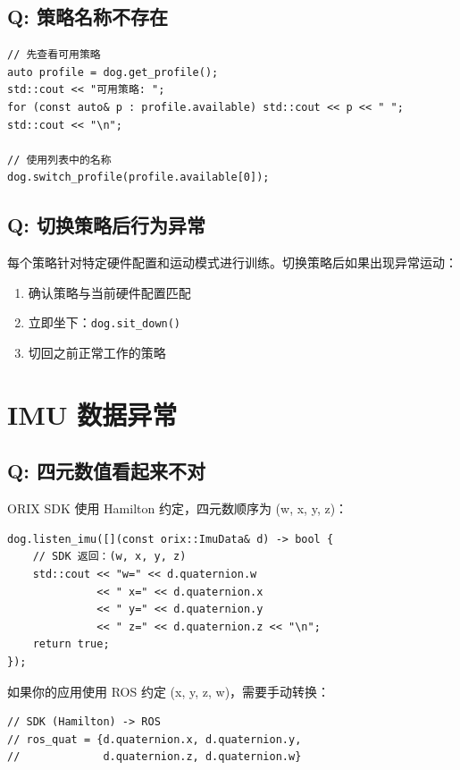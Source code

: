 \documentclass[a4paper,11pt,openany]{book}
\begin{document}
\subsection{Q: 策略名称不存在}

\begin{lstlisting}[style=cpp]
// 先查看可用策略
auto profile = dog.get_profile();
std::cout << "可用策略: ";
for (const auto& p : profile.available) std::cout << p << " ";
std::cout << "\n";

// 使用列表中的名称
dog.switch_profile(profile.available[0]);
\end{lstlisting}

\subsection{Q: 切换策略后行为异常}

每个策略针对特定硬件配置和运动模式进行训练。切换策略后如果出现异常运动：
\begin{enumerate}[nosep]
  \item 确认策略与当前硬件配置匹配
  \item 立即坐下：\texttt{dog.sit\_down()}
  \item 切回之前正常工作的策略
\end{enumerate}

\section{IMU 数据异常}

\subsection{Q: 四元数值看起来不对}

ORIX SDK 使用 Hamilton 约定，四元数顺序为 (w, x, y, z)：

\begin{lstlisting}[style=cpp]
dog.listen_imu([](const orix::ImuData& d) -> bool {
    // SDK 返回：(w, x, y, z)
    std::cout << "w=" << d.quaternion.w
              << " x=" << d.quaternion.x
              << " y=" << d.quaternion.y
              << " z=" << d.quaternion.z << "\n";
    return true;
});
\end{lstlisting}

如果你的应用使用 ROS 约定 (x, y, z, w)，需要手动转换：

\begin{lstlisting}[style=cpp]
// SDK (Hamilton) -> ROS
// ros_quat = {d.quaternion.x, d.quaternion.y,
//             d.quaternion.z, d.quaternion.w}
\end{lstlisting}
\end{document}
